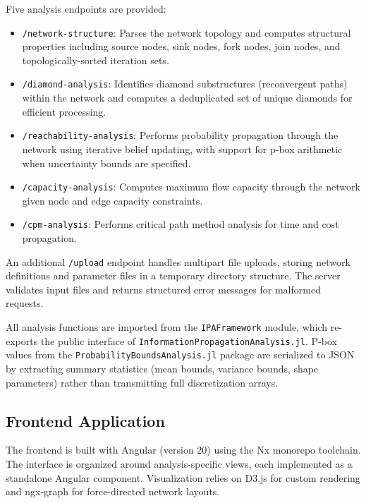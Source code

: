 \documentclass[conference]{IEEEtran}
\begin{document}
Five analysis endpoints are provided:
\begin{itemize}
    \item \texttt{/network-structure}: Parses the network topology and computes structural properties including source nodes, sink nodes, fork nodes, join nodes, and topologically-sorted iteration sets.
    \item \texttt{/diamond-analysis}: Identifies diamond substructures (reconvergent paths) within the network and computes a deduplicated set of unique diamonds for efficient processing.
    \item \texttt{/reachability-analysis}: Performs probability propagation through the network using iterative belief updating, with support for p-box arithmetic when uncertainty bounds are specified.
    \item \texttt{/capacity-analysis}: Computes maximum flow capacity through the network given node and edge capacity constraints.
    \item \texttt{/cpm-analysis}: Performs critical path method analysis for time and cost propagation.
\end{itemize}
  
An additional \texttt{/upload} endpoint handles multipart file uploads, storing network definitions and parameter files in a temporary directory structure. The server validates input files and returns structured error messages for malformed requests.

All analysis functions are imported from the \texttt{IPAFramework} module, which re-exports the public interface of \texttt{InformationPropagationAnalysis.jl}. P-box values from the \texttt{ProbabilityBoundsAnalysis.jl} package are serialized to JSON by extracting summary statistics (mean bounds, variance bounds, shape parameters) rather than transmitting full discretization arrays.

\subsection{Frontend Application}

The frontend is built with Angular (version 20) using the Nx monorepo toolchain. The interface is organized around analysis-specific views, each implemented as a standalone Angular component. Visualization relies on D3.js for custom rendering and ngx-graph for force-directed network layouts.
\end{document}

